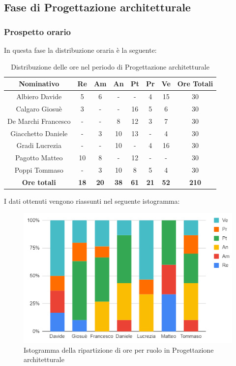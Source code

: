 \subsection{Fase di Progettazione architetturale}
\subsubsection{Prospetto orario}
In questa fase la distribuzione oraria è la seguente:
\begin{table}[H]
		\begin{center}
			\setlength{\aboverulesep}{0pt}
			\setlength{\belowrulesep}{0pt}
			\setlength{\extrarowheight}{.75ex}
			\begin{tabular}{ c c c c c c c c }
				\rowcolor{AzzurroGruppo!30} 
				\textbf{Nominativo} & \textbf{Re} & \textbf{Am} & \textbf{An} & \textbf{Pt} & \textbf{Pr} & \textbf{Ve} & \textbf{Ore Totali}  \\
				\toprule
				Albiero Davide      & 5  & 6 & -  & -  & 4 & 15 & 30 \\
				Calgaro Giosuè      & 3  & - & -  & 16 & 5 & 6  & 30 \\
				De Marchi Francesco & -  & - & 8  & 12 & 3 & 7  & 30\\
				Giacchetto Daniele  & -  & 3 & 10 & 13 & - & 4  & 30\\
				Gradi Lucrezia      & -  & - & 10 & -  & 4 & 16 & 30\\
				Pagotto Matteo      & 10 & 8 & -  & 12 & - & -  & 30\\
				Poppi Tommaso       & -  & 3 & 10 & 8  & 5 & 4  & 30\\
				 \textbf{Ore totali} & \textbf{18} & \textbf{20} & \textbf{38} & \textbf{61} & \textbf{21} & \textbf{52} & \textbf{210} \\
				\bottomrule
			\end{tabular}
			\caption{Distribuzione delle ore nel periodo di  Progettazione architetturale}
		\end{center}
	\end{table}
I dati ottenuti vengono riassunti nel seguente istogramma:
\begin{figure}[H]
    \centering
    \includegraphics[scale = 0.5]{components/img/architettura_isto.png}
    \caption{Istogramma della ripartizione di ore per ruolo in Progettazione architetturale}
    \label{fig:logo}
\end{figure}
